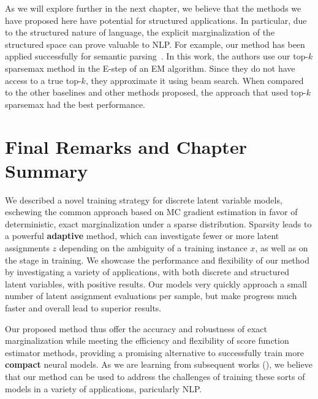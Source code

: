 As we will explore further in the next chapter, we believe that the
methods we have proposed here have potential for structured
applications. In particular, due to the structured nature of
language, the explicit marginalization of the structured space can
prove valuable to NLP. For example, our method has been applied
successfully for semantic
parsing~\citep{wang2021LearningExecutionsSemantic}. In this work, the
authors use our top-$k$ sparsemax method in the E-step of an EM
algorithm. Since they do not have access to a true top-$k$, they
approximate it using beam search. When compared to the other
baselines and other methods proposed, the approach that used top-$k$
sparsemax had the best performance.

\section{Final Remarks and Chapter Summary}

We described a novel training strategy for discrete latent variable
models, eschewing the common approach based on MC gradient estimation
in favor of deterministic, exact marginalization under a sparse
distribution. Sparsity leads to a powerful \textbf{adaptive} method,
which can investigate fewer or more latent assignments $z$ depending
on the ambiguity of a training instance $x$, as well as on the stage
in training. We showcase the performance and flexibility of our
method by investigating a variety of applications, with both discrete
and structured latent variables, with positive results. Our models
very quickly approach a small number of latent assignment evaluations
per sample, but make progress much faster and overall lead to
superior results.

Our proposed method thus offer the accuracy and robustness of exact
marginalization while meeting the efficiency and flexibility of score
function estimator methods, providing a promising alternative to
successfully train more \textbf{compact} neural models. As we are
learning from subsequent works (), we believe
that our method can be used to address the challenges of training
these sorts of models in a variety of applications, paricularly NLP.

\cleardoublepage
